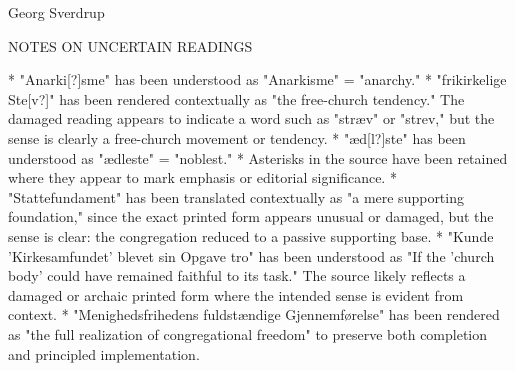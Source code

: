 Georg Sverdrup

NOTES ON UNCERTAIN READINGS

* "Anarki[?]sme" has been understood as "Anarkisme" = "anarchy."
* "frikirkelige Ste[v?]" has been rendered contextually as "the free-church tendency." The damaged reading appears to indicate a word such as "stræv" or "strev," but the sense is clearly a free-church movement or tendency.
* "æd[l?]ste" has been understood as "ædleste" = "noblest."
* Asterisks in the source have been retained where they appear to mark emphasis or editorial significance.
* "Stattefundament" has been translated contextually as "a mere supporting foundation," since the exact printed form appears unusual or damaged, but the sense is clear: the congregation reduced to a passive supporting base.
* "Kunde 'Kirkesamfundet' blevet sin Opgave tro" has been understood as "If the 'church body' could have remained faithful to its task." The source likely reflects a damaged or archaic printed form where the intended sense is evident from context.
* "Menighedsfrihedens fuldstændige Gjennemførelse" has been rendered as "the full realization of congregational freedom" to preserve both completion and principled implementation.
